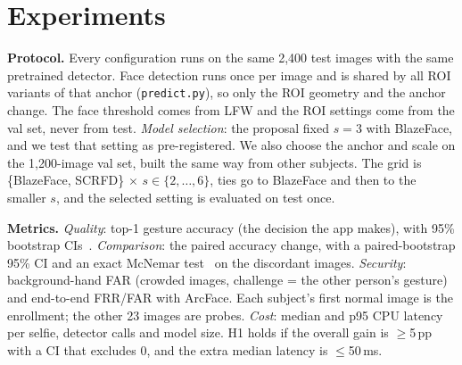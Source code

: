 \section{Experiments}
\label{sec:exp}

\noindent\textbf{Protocol.} Every configuration runs on the same 2,400 test images with the same pretrained
detector. Face detection runs once per image and is shared by all ROI variants of that anchor
(\texttt{predict.py}), so only the ROI geometry and the anchor change. The face threshold comes from LFW and the ROI
settings come from the val set, never from test.
\emph{Model selection}: the proposal fixed $s{=}3$ with BlazeFace, and we test that setting as pre-registered.
We also choose the anchor and scale on the 1,200-image val set, built the same way from other subjects. The grid
is \{BlazeFace, SCRFD\} $\times$ $s\in\{2,\dots,6\}$, ties go to BlazeFace and then to the smaller $s$, and the
selected setting is evaluated on test once.

\noindent\textbf{Metrics.} \emph{Quality}: top-1 gesture accuracy (the decision the app makes), with 95\%
bootstrap CIs~\cite{efron}. \emph{Comparison}: the paired accuracy change, with a paired-bootstrap 95\% CI and an
exact McNemar test~\cite{mcnemar} on the discordant images. \emph{Security}: background-hand FAR (crowded images,
challenge = the other person's gesture) and end-to-end FRR/FAR with ArcFace. Each subject's first normal image is
the enrollment; the other 23 images are probes. \emph{Cost}: median and p95 CPU latency per selfie, detector calls
and model size. H1 holds if the overall gain is $\geq$5\,pp with a CI that excludes 0, and the extra median latency
is $\leq$50\,ms.
